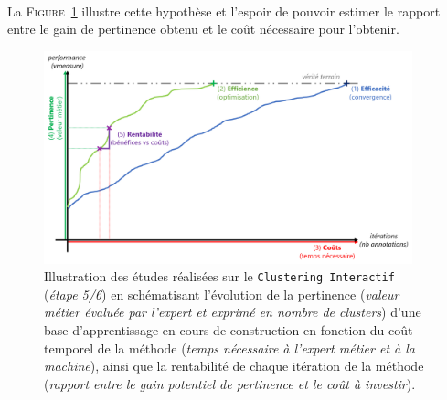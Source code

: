 	\begin{tcolorbox}[
		title=\faVial~\textbf{Hypothèse de rentabilité}~\faVial,
		colback=colorTcolorboxHypothesis!15,
		colframe=colorTcolorboxHypothesis!75,
		width=\linewidth
	]
		 \\
		
		La \textsc{Figure~\ref{figure:4.5-HYPOTHESE-RENTABILITE}} illustre cette hypothèse et l'espoir de pouvoir estimer le rapport entre le gain de pertinence obtenu et le coût nécessaire pour l'obtenir.
		\begin{figure}[H]  %
			\centering
			\includegraphics[width=0.95\textwidth]{figures/hypotheses-05-rentabilite}
			\caption{
				Illustration des études réalisées sur le \texttt{Clustering Interactif} (\textit{étape 5/6}) en schématisant l'évolution de la pertinence (\textit{valeur métier évaluée par l'expert et exprimé en nombre de clusters}) d'une base d'apprentissage en cours de construction en fonction du coût temporel de la méthode (\textit{temps nécessaire à l'expert métier et à la machine}), ainsi que la rentabilité de chaque itération de la méthode (\textit{rapport entre le gain potentiel de pertinence et le coût à investir}).
			}
			\label{figure:4.5-HYPOTHESE-RENTABILITE}
		\end{figure}
	\end{tcolorbox}
		
